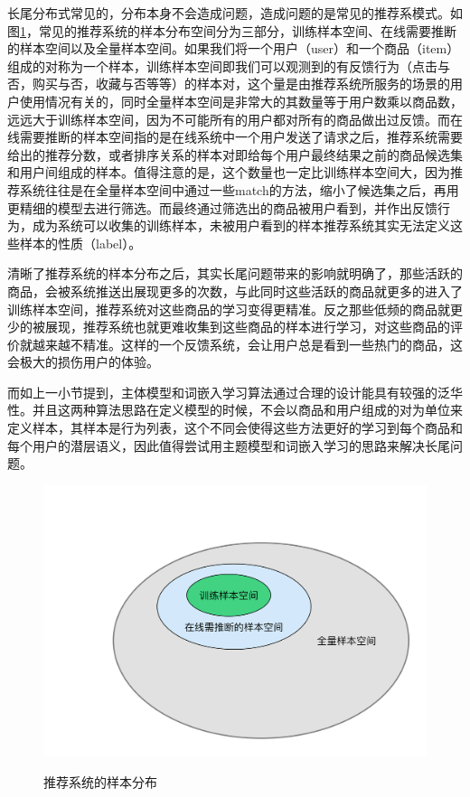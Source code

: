 长尾分布式常见的，分布本身不会造成问题，造成问题的是常见的推荐系模式。如图\ref{fig:Sample}，常见的推荐系统的样本分布空间分为三部分，训练样本空间、在线需要推断的样本空间以及全量样本空间。如果我们将一个用户（user）和一个商品（item）组成的对称为一个样本，训练样本空间即我们可以观测到的有反馈行为（点击与否，购买与否，收藏与否等等）的样本对，这个量是由推荐系统所服务的场景的用户使用情况有关的，同时全量样本空间是非常大的其数量等于用户数乘以商品数，远远大于训练样本空间，因为不可能所有的用户都对所有的商品做出过反馈。而在线需要推断的样本空间指的是在线系统中一个用户发送了请求之后，推荐系统需要给出的推荐分数，或者排序关系的样本对即给每个用户最终结果之前的商品候选集和用户间组成的样本。值得注意的是，这个数量也一定比训练样本空间大，因为推荐系统往往是在全量样本空间中通过一些match的方法，缩小了候选集之后，再用更精细的模型去进行筛选。而最终通过筛选出的商品被用户看到，并作出反馈行为，成为系统可以收集的训练样本，未被用户看到的样本推荐系统其实无法定义这些样本的性质（label）。

清晰了推荐系统的样本分布之后，其实长尾问题带来的影响就明确了，那些活跃的商品，会被系统推送出展现更多的次数，与此同时这些活跃的商品就更多的进入了训练样本空间，推荐系统对这些商品的学习变得更精准。反之那些低频的商品就更少的被展现，推荐系统也就更难收集到这些商品的样本进行学习，对这些商品的评价就越来越不精准。这样的一个反馈系统，会让用户总是看到一些热门的商品，这会极大的损伤用户的体验。

而如上一小节提到，主体模型和词嵌入学习算法通过合理的设计能具有较强的泛华性。并且这两种算法思路在定义模型的时候，不会以商品和用户组成的对为单位来定义样本，其样本是行为列表，这个不同会使得这些方法更好的学习到每个商品和每个用户的潜层语义，因此值得尝试用主题模型和词嵌入学习的思路来解决长尾问题。
\begin{figure}[!h]
\centering
  \includegraphics[width=1.0\textwidth]{./graph/Sample.png}\\
  \caption{推荐系统的样本分布}
\label{fig:Sample}
\end{figure}

